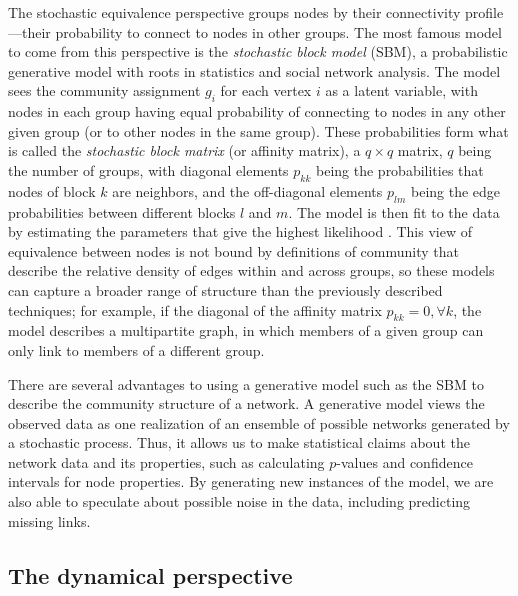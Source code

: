 The stochastic equivalence perspective groups nodes by their
connectivity profile---their probability to connect to nodes in other
groups. The most famous model to come from this perspective is the
\emph{stochastic block model} (SBM), a probabilistic generative model
with roots in statistics and social network analysis. The model sees the
community assignment \(g_i\) for each vertex \(i\) as a latent variable,
with nodes in each group having equal probability of connecting to nodes
in any other given group (or to other nodes in the same group). These
probabilities form what is called the \emph{stochastic block matrix} (or
affinity matrix), a \(q \times q\) matrix, \(q\) being the number of
groups, with diagonal elements \(p_{kk}\) being the probabilities that
nodes of block \(k\) are neighbors, and the off-diagonal elements
\(p_{lm}\) being the edge probabilities between different blocks \(l\)
and \(m\). The model is then fit to the data by estimating the
parameters that give the highest likelihood
\autocites{fortunato_community_2016}{schaub_many_2017}. This view of
equivalence between nodes is not bound by definitions of community that
describe the relative density of edges within and across groups, so
these models can capture a broader range of structure than the
previously described techniques; for example, if the diagonal of the
affinity matrix \(p_{kk} = 0, \forall k\), the model describes a
multipartite graph, in which members of a given group can only link to
members of a different group.

There are several advantages to using a generative model such as the SBM
to describe the community structure of a network. A generative model
views the observed data as one realization of an ensemble of possible
networks generated by a stochastic process. Thus, it allows us to make
statistical claims about the network data and its properties, such as
calculating \(p\)-values and confidence intervals for node properties.
By generating new instances of the model, we are also able to speculate
about possible noise in the data, including predicting missing links.


\hypertarget{the-dynamical-perspective}{\subsection{The dynamical
perspective}\label{the-dynamical-perspective}}

